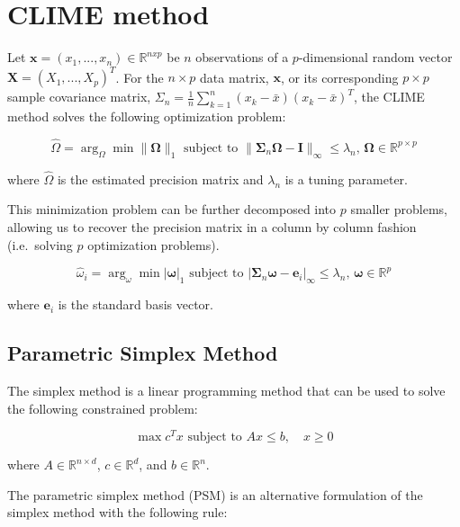 \documentclass{article}
\begin{document}
    \section{CLIME method}\label{clime-method}

    Let $\textbf{x}=(x_1,...,x_n)\in\mathbb{R}^{nxp}$ be $n$ observations of
a $p$-dimensional random vector $\textbf{X}=(X_1,...,X_p)^T$. For the
$n\times p$ data matrix, $\textbf{x}$, or its corresponding $p\times p$
sample covariance matrix,
$\Sigma_n=\frac{1}{n}\sum_{k=1}^{n}(x_k-\bar{x})(x_k-\bar{x})^T$, the
CLIME method solves the following optimization problem:

\begin{equation*}
\hat{\Omega}=\arg_\Omega\min \| \mathbf{\Omega} \|_1\text{ subject to }\|\mathbf{\Sigma}_n\mathbf{\Omega}-\textbf{I}\|_\infty\le\lambda_n\text{, }\mathbf{\Omega}\in\mathbb{R}^{p\times p}
\end{equation*}

where $\hat{\Omega}$ is the estimated precision matrix and $\lambda_n$
is a tuning parameter.

This minimization problem can be further decomposed into $p$ smaller
problems, allowing us to recover the precision matrix in a column by
column fashion (i.e.~solving $p$ optimization problems).

\begin{equation}
\hat{\omega}_i=\arg_\omega\min | \mathbf{\omega} |_1\text{ subject to }|\mathbf{\Sigma}_n\mathbf{\omega}-\textbf{e}_i|_\infty\le\lambda_n\text{, }\mathbf{\omega}\in\mathbb{R}^{p}
\end{equation}

where $\textbf{e}_i$ is the standard basis vector.

    \subsection{Parametric Simplex Method}\label{parametric-simplex-method}

    The simplex method is a linear programming method that can be used to
solve the following constrained problem:

\begin{equation*}
\max c^T x \text{ subject to } Ax\le b, \quad x\ge 0
\end{equation*}

where $A\in\mathbb{R}^{n\times d}$, $c\in\mathbb{R}^d$, and
$b\in\mathbb{R}^n$.

The parametric simplex method (PSM) is an alternative formulation of the
simplex method with the following rule:
\end{document}
